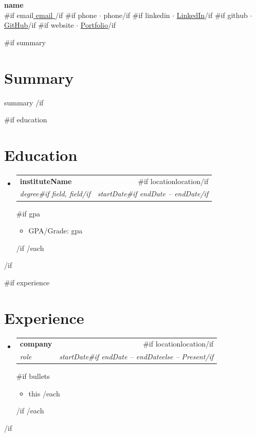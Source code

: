 \documentclass[10pt,a4paper]{article}
\makeatletter
\newcommand{\resumeItem}[1]{\item\small{#1}}
\newcommand{\resumeSubheading}[4]{
  \vspace{-2pt}\item
    \begin{tabular*}{0.97\textwidth}[t]{l@{\extracolsep{\fill}}r}
      \textbf{#1} & #2 \\
      \textit{\small#3} & \textit{\small #4} \\
    \end{tabular*}\vspace{-7pt}
}
\makeatother
\begin{document}

\begin{center}
  {\LARGE \textbf{ {{name}} }}\\[4pt]
  \small
  {{#if email}}\href{mailto:{{email}} }{ {{email}} }{{/if}}
  {{#if phone}} $\cdot$ {{phone}}{{/if}}
  {{#if linkedin}} $\cdot$ \href{ {{linkedin}} }{LinkedIn}{{/if}}
  {{#if github}} $\cdot$ \href{ {{github}} }{GitHub}{{/if}}
  {{#if website}} $\cdot$ \href{ {{website}} }{Portfolio}{{/if}}
\end{center}

{{#if summary}}
\section{Summary}
{{summary}}
{{/if}}

{{#if education}}
\section{Education}
\begin{itemize}[leftmargin=0.15in, label={}]
{{#each education}}
  \resumeSubheading
    { {{instituteName}} }{ {{#if location}}{{location}}{{/if}} }
    { {{degree}}{{#if field}}, {{field}}{{/if}} }{ {{startDate}}{{#if endDate}} -- {{endDate}}{{/if}} }
  {{#if gpa}}
  \begin{itemize}[leftmargin=0.3in, label=\textbullet]
    \resumeItem{GPA/Grade: {{gpa}} }
  \end{itemize}
  {{/if}}
{{/each}}
\end{itemize}
{{/if}}

{{#if experience}}
\section{Experience}
\begin{itemize}[leftmargin=0.15in, label={}]
{{#each experience}}
  \resumeSubheading
    { {{company}} }{ {{#if location}}{{location}}{{/if}} }
    { {{role}} }{ {{startDate}}{{#if endDate}} -- {{endDate}}{{else}} -- Present{{/if}} }
  {{#if bullets}}
  \begin{itemize}[leftmargin=0.3in, label=\textbullet]
    {{#each bullets}}
    \resumeItem{ {{this}} }
    {{/each}}
  \end{itemize}
  {{/if}}
{{/each}}
\end{itemize}
{{/if}}
\end{document}
